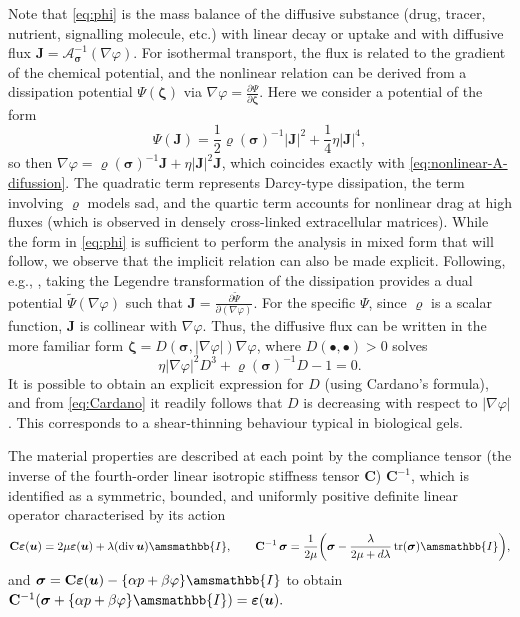 \documentclass[fleqn,a4paper]{cas-sc}
\newcommand\vdiv{\mathop{\mathrm{div}}\nolimits}
\newcommand\tr{\mathop{\mathrm{tr}}\nolimits}
\newcommand{\beps}{\boldsymbol{\varepsilon}}
\newcommand{\bC}{\mathbf{C}}
\newcommand{\bu}{\boldsymbol{u}}
\newcommand{\bzeta}{\boldsymbol{\zeta}}
\newcommand{\0}{\boldsymbol{0}}
\newcommand\cA{\mathcal{A}}
\newcommand\bJ{\mathbf{J}}
\newcommand\bbI{\amsmathbb{I}}
\newcommand\bsigma{\boldsymbol{\sigma}}
\numberwithin{equation}{section}
\numberwithin{figure}{section}
\begin{document}
Note that \eqref{eq:phi} is the mass balance of the diffusive substance (drug, tracer, nutrient, signalling molecule, etc.) with linear decay or uptake and with diffusive flux $\bJ=\cA_{\bsigma}^{-1}(\nabla \varphi)$. 
For isothermal transport, the flux is related to the gradient of the chemical potential, and the nonlinear relation can be derived from a dissipation potential $\Psi(\bzeta)$ via $\nabla \varphi = \frac{\partial\Psi}{\partial \bzeta}$. Here we consider a potential of the form 
\[ 
\Psi(\bJ) = \frac12\varrho(\bsigma)^{-1}|\bJ|^2+\frac14\eta|\bJ|^4,
\]
so then $\nabla \varphi = \varrho(\bsigma)^{-1} \bJ + \eta |\bJ|^2\bJ$, which coincides exactly with \eqref{eq:nonlinear-A-difussion}. The quadratic term represents Darcy-type dissipation, the term involving $\varrho$ models \gls{sad}, and the quartic term accounts for nonlinear drag at high fluxes (which is observed in densely cross-linked extracellular matrices). While the form in \eqref{eq:phi} is sufficient to perform the analysis in mixed form that will follow, we observe that the implicit relation can also be made explicit. Following, e.g., \cite{mielke2011gradient}, taking the Legendre transformation of the dissipation provides a dual potential $\widetilde{\Psi}(\nabla \varphi)$ such that $\bJ = \frac{\partial \widetilde{\Psi}}{\partial (\nabla \varphi)}$. For the specific $\Psi$, since $\varrho$ is a scalar function, $\bJ$ is collinear with $\nabla \varphi$. Thus, the diffusive flux can be written in the more familiar form $\bzeta = D(\bsigma,|\nabla \varphi|)\nabla \varphi$, where $D(\bullet,\bullet)>0$ solves 
\begin{equation}\label{eq:Cardano} 
\eta |\nabla \varphi|^2 D^3 + \varrho(\bsigma)^{-1}D - 1 =0.
\end{equation}
It is possible to obtain an explicit expression for $D$ (using Cardano's formula), and from \eqref{eq:Cardano} it readily follows that $D$ is decreasing with respect to $|\nabla \varphi|$. This corresponds to a shear-thinning behaviour typical in biological gels.

The material properties are described at each point by the compliance tensor (the inverse of the fourth-order  linear isotropic stiffness tensor $\bC$) $\bC^{-1}$, which is identified as a symmetric, bounded, and uniformly positive definite linear operator characterised by its action 
\begin{equation*}%
\bC\beps(\bu) = 2\mu\beps(\bu) + \lambda(\vdiv\bu)\bbI,\qquad \bC^{-1}\,\bsigma = \frac{1}{2\mu}\biggl(\bsigma - \frac{\lambda}{2\mu+d\lambda} \tr(\bsigma)\bbI\biggr),\end{equation*}
and $\bsigma= \bC\beps(\bu)-\{ \alpha p + \beta \varphi\}\bbI$ to obtain $\bC^{-1} (\bsigma + \{\alpha p + \beta \varphi\} \bbI) =  \beps(\bu).$
\end{document}
